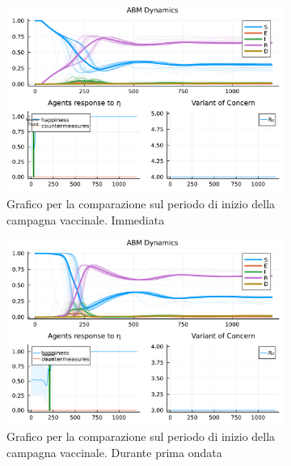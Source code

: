 \begin{figure}[!hb]
	\centering
	\begin{subfigure}[b]{0.45\textwidth}
		\centering
		\includegraphics[width=\textwidth]{img/SocialNetworkABM_4_V.pdf}
		\caption{Grafico per la comparazione sul periodo di inizio della campagna vaccinale. Immediata}
		\label{fig:comparison_vax_1}
	\end{subfigure}
	\hfill
	\begin{subfigure}[b]{0.45\textwidth}
		\centering
		\includegraphics[width=\textwidth]{img/SocialNetworkABM_3_V.pdf}
		\caption{Grafico per la comparazione sul periodo di inizio della campagna vaccinale. Durante prima ondata}
		\label{fig:comparison_vax_2}
	\end{subfigure}
	\hfill
	\begin{subfigure}[b]{0.45\textwidth}
		\centering

\end{subfigure}
\end{figure}
